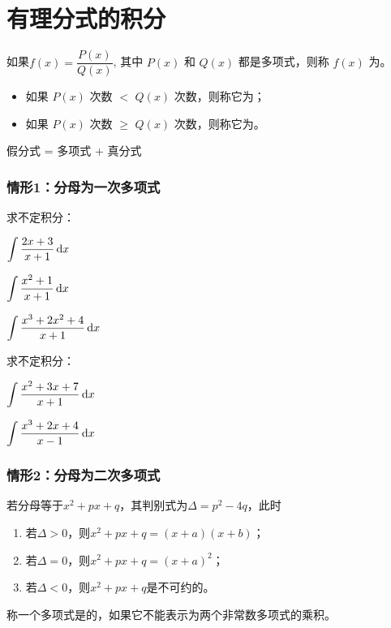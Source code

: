 \documentclass[14pt,notheorems,leqno,xcolor={rgb}]{beamer} %
\begin{document}
\section{有理分式的积分}

\begin{frame}
\begin{definition}
如果$f(x)=\dfrac{P(x)}{Q(x)}$, 其中 $P(x)$ 和 $Q(x)$ 都是多项式，则称 $f(x)$ 为。\pause
\begin{itemize}
  \item 如果 $P(x)$ 次数 $<$   $Q(x)$ 次数，则称它为；
  \item 如果 $P(x)$ 次数 $\ge$ $Q(x)$ 次数，则称它为。
\end{itemize}
\end{definition}
\vpause
\begin{theorem}
假分式 = 多项式 + 真分式
\end{theorem}
\end{frame}

\begin{frame}
\frametitle{情形1：分母为一次多项式}
\begin{example}求不定积分：
\begin{enumlite}
  \item $\Int\dfrac{2x+3}{x+1} \d x$
  \item $\Int\dfrac{x^2+1}{x+1} \d x$
  \item $\Int\dfrac{x^3+2x^2+4}{x+1} \d x$
\end{enumlite}
\end{example}
\end{frame}

\begin{frame}
\begin{exercise}求不定积分：
\begin{enumlite}
  \item $\Int\dfrac{x^2+3x+7}{x+1}\d x$
  \item $\Int\dfrac{x^3+2x+4}{x-1}\d x$
\end{enumlite}
\end{exercise}
\end{frame}

\begin{frame}
\frametitle{情形2：分母为二次多项式}
若分母等于$x^2+px+q$，其判别式为$\Delta=p^2-4q$，此时
\begin{enumerate}
  \item 若$\Delta>0$，则$x^2+px+q=(x+a)(x+b)$；
  \item 若$\Delta=0$，则$x^2+px+q=(x+a)^2$；
  \item 若$\Delta<0$，则$x^2+px+q$是不可约的。
\end{enumerate}
\pause
\begin{definition*}
称一个多项式是的，如果它不能表示为两个非常数多项式的乘积。
\end{definition*}
\end{frame}
\end{document}
